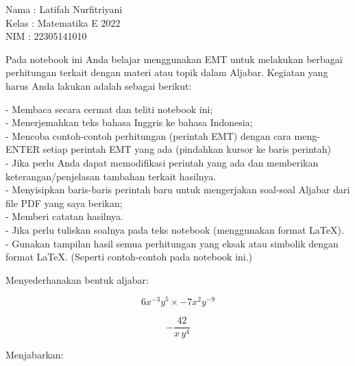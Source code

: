 \documentclass[a4paper,10pt]{article}
\begin{document}
\begin{eulernotebook}
\begin{eulercomment}
Nama  : Latifah Nurfitriyani\\
Kelas : Matematika E 2022\\
NIM   : 22305141010\\
\end{eulercomment}
\eulersubheading{}
\begin{eulercomment}
\begin{eulercomment}
\begin{eulercomment}
Pada notebook ini Anda belajar menggunakan EMT untuk melakukan
berbagai perhitungan terkait dengan materi atau topik dalam Aljabar.
Kegiatan yang harus Anda lakukan adalah sebagai berikut:

- Membaca secara cermat dan teliti notebook ini;\\
- Menerjemahkan teks bahasa Inggris ke bahasa Indonesia;\\
- Mencoba contoh-contoh perhitungan (perintah EMT) dengan cara
meng-ENTER setiap perintah EMT yang ada (pindahkan kursor ke baris
perintah)\\
- Jika perlu Anda dapat memodifikasi perintah yang ada dan memberikan
keterangan/penjelasan tambahan terkait hasilnya.\\
- Menyisipkan baris-baris perintah baru untuk mengerjakan soal-soal
Aljabar dari file PDF yang saya berikan;\\
- Memberi catatan hasilnya.\\
- Jika perlu tuliskan soalnya pada teks notebook (menggunakan format
LaTeX).\\
- Gunakan tampilan hasil semua perhitungan yang eksak atau simbolik
dengan format LaTeX. (Seperti contoh-contoh pada notebook ini.)

\end{eulercomment}
\begin{eulercomment}
Menyederhanakan bentuk aljabar:

\end{eulercomment}
\begin{eulerformula}
\[
6x^{-3}y^5\times -7x^2y^{-9}
\]
\end{eulerformula}
\begin{eulercomment}
\end{eulercomment}
\begin{eulerformula}
\[
-\frac{42}{x\,y^4}
\]
\end{eulerformula}
\begin{eulercomment}
Menjabarkan:


\end{eulercomment}
\end{eulercomment}
\end{eulercomment}
\end{eulernotebook}
\end{document}
